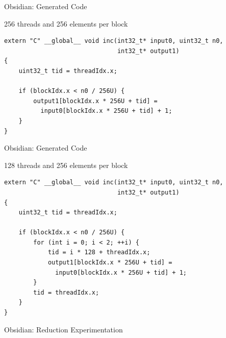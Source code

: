 \documentclass[xcolor=dvipsnames]{beamer}
\begin{document}
%
\newcommand\Fontvi{\fontsize{8}{7.2}\selectfont}

\begin{frame}[fragile]{Obsidian: Generated Code}
\begin{block}{256 threads and 256 elements per block} 
\Fontvi
\begin{verbatim} 
extern "C" __global__ void inc(int32_t* input0, uint32_t n0,
                               int32_t* output1)
{
    uint32_t tid = threadIdx.x;
     
    if (blockIdx.x < n0 / 256U) {
        output1[blockIdx.x * 256U + tid] = 
          input0[blockIdx.x * 256U + tid] + 1;
    }
}
\end{verbatim} 

\end{block}
\end{frame}

%
\begin{frame}[fragile]{Obsidian: Generated Code}
\begin{block}{128 threads and 256 elements per block}
\Fontvi
\begin{verbatim} 
extern "C" __global__ void inc(int32_t* input0, uint32_t n0,
                               int32_t* output1)
{
    uint32_t tid = threadIdx.x;
    
    if (blockIdx.x < n0 / 256U) {
        for (int i = 0; i < 2; ++i) {
            tid = i * 128 + threadIdx.x;
            output1[blockIdx.x * 256U + tid] = 
              input0[blockIdx.x * 256U + tid] + 1;
        }
        tid = threadIdx.x;
    }
}
\end{verbatim} 
\end{block} 


\end{frame} 

%

\begin{frame}{Obsidian: Reduction Experimentation}

  


\end{frame} 
\end{document}
